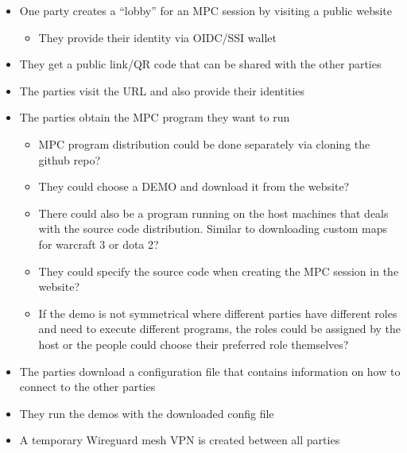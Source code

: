 \begin{frame}
\end{frame}

\begin{frame}
\end{frame}

\begin{frame}
\begin{itemize}
\tightlist
\item
  One party creates a ``lobby'' for an MPC session by visiting a public
  website

  \begin{itemize}
  \tightlist
  \item
    They provide their identity via OIDC/SSI wallet
  \end{itemize}
\item
  They get a public link/QR code that can be shared with the other
  parties
\item
  The parties visit the URL and also provide their identities
\item
  The parties obtain the MPC program they want to run

  \begin{itemize}
  \tightlist
  \item
    MPC program distribution could be done separately via cloning the
    github repo?
  \item
    They could choose a DEMO and download it from the website?
  \item
    There could also be a program running on the host machines that
    deals with the source code distribution. Similar to downloading
    custom maps for warcraft 3 or dota 2?
  \item
    They could specify the source code when creating the MPC session in
    the website?
  \item
    If the demo is not symmetrical where different parties have
    different roles and need to execute different programs, the roles
    could be assigned by the host or the people could choose their
    preferred role themselves?
  \end{itemize}
\item
  The parties download a configuration file that contains information on
  how to connect to the other parties
\item
  They run the demos with the downloaded config file
\item
  A temporary Wireguard mesh VPN is created between all parties
\end{itemize}
\end{frame}

